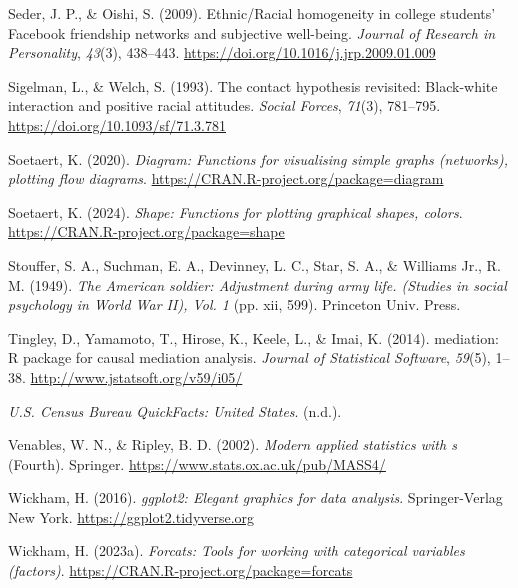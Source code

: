 \documentclass[
  man,floatsintext]{apa7}
\newlength{\cslhangindent}
\newlength{\cslentryspacingunit} %
\newenvironment{CSLReferences}[2] %
 {%
  \setlength{\parindent}{0pt}
  \ifodd #1
  \let\oldpar\par
  \def\par{\hangindent=\cslhangindent\oldpar}
  \fi
  \setlength{\parskip}{#2\cslentryspacingunit}
 }%
 {}
\begin{document}
\begin{CSLReferences}{1}{0}
\leavevmode{}%
Seder, J. P., \& Oishi, S. (2009). Ethnic/{Racial} homogeneity in college students' {Facebook} friendship networks and subjective well-being. \emph{Journal of Research in Personality}, \emph{43}(3), 438--443. \url{https://doi.org/10.1016/j.jrp.2009.01.009}

\leavevmode{}%
Sigelman, L., \& Welch, S. (1993). The contact hypothesis revisited: {Black-white} interaction and positive racial attitudes. \emph{Social Forces}, \emph{71}(3), 781--795. \url{https://doi.org/10.1093/sf/71.3.781}

\leavevmode{}%
Soetaert, K. (2020). \emph{Diagram: Functions for visualising simple graphs (networks), plotting flow diagrams}. \url{https://CRAN.R-project.org/package=diagram}

\leavevmode{}%
Soetaert, K. (2024). \emph{Shape: Functions for plotting graphical shapes, colors}. \url{https://CRAN.R-project.org/package=shape}

\leavevmode{}%
Stouffer, S. A., Suchman, E. A., Devinney, L. C., Star, S. A., \& Williams Jr., R. M. (1949). \emph{The {American} soldier: {Adjustment} during army life. ({Studies} in social psychology in {World War II}), {Vol}. 1} (pp. xii, 599). Princeton Univ. Press.

\leavevmode{}%
Tingley, D., Yamamoto, T., Hirose, K., Keele, L., \& Imai, K. (2014). {mediation}: {R} package for causal mediation analysis. \emph{Journal of Statistical Software}, \emph{59}(5), 1--38. \url{http://www.jstatsoft.org/v59/i05/}

\leavevmode{}%
\emph{U.{S}. {Census Bureau QuickFacts}: {United States}}. (n.d.).

\leavevmode{}%
Venables, W. N., \& Ripley, B. D. (2002). \emph{Modern applied statistics with s} (Fourth). Springer. \url{https://www.stats.ox.ac.uk/pub/MASS4/}

\leavevmode{}%
Wickham, H. (2016). \emph{ggplot2: Elegant graphics for data analysis}. Springer-Verlag New York. \url{https://ggplot2.tidyverse.org}

\leavevmode{}%
Wickham, H. (2023a). \emph{Forcats: Tools for working with categorical variables (factors)}. \url{https://CRAN.R-project.org/package=forcats}


\end{CSLReferences}
\end{document}
